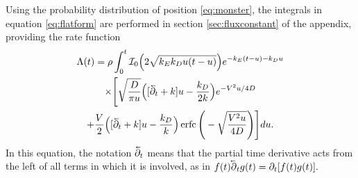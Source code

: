 Using the probability distribution of position \ref{eq:monster}, the integrals in equation \ref{eq:flatform} are performed in section \ref{sec:fluxconstant} of the appendix, providing the rate function
\begin{multline} 
\Lambda(t) = \rho \int_0^t \mathcal{I}_0\Big(2\sqrt{k_Ek_Du(t-u)}\Big)e^{-k_E(t-u)-k_D u} \\
\times \Bigg[\sqrt{\frac{D}{\pi u}}\Big([\cev{\partial_t} + k]u-\frac{k_D}{2 k}\Big)e^{-V^2 u/4D} \\+ \frac{V}{2}\Big([\cev{\partial_t} + k]u -\frac{k_D}{k}\Big) \erfc\Bigg(-\sqrt{\frac{V^2 u}{4D}}\Bigg)\Bigg] du. \label{eq:fluxy}
\end{multline}
In this equation, the notation $\cev{\partial_t}$ means that the partial time derivative acts from the left of all terms in which it is involved, as in $f(t)\cev{\partial}_t g(t) = \partial_t [f(t)g(t)].$

